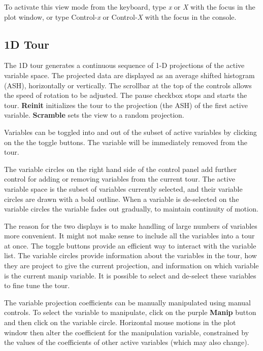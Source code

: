 \documentclass[11pt]{article}
\begin{document}
To activate this view mode from the keyboard, type {\em x} or {\em X}
with the focus in the plot window, or type Control-{\em x} or
Control-{\em X} with the focus in the console.

\subsection{1D Tour}
\label{slbl:1DTour}

The 1D tour generates a continuous sequence of 1-D projections of the
active variable space. The projected data are displayed as an average
shifted histogram (ASH), horizontally or vertically. The scrollbar at the
top of the controls allows the speed of rotation to be adjusted. The
pause checkbox stops and starts the tour. {\bf Reinit} initializes the tour
to the projection (the ASH) of the first active variable.  {\bf Scramble} sets
the view to a random projection.

Variables can be toggled into and out of the subset of active
variables by clicking on the the toggle buttons. The variable will be
immediately removed from the tour. 

The variable circles on the right hand side of the control panel add
further control for adding or removing variables from the current
tour. The active variable space is the subset of variables currently
selected, and their variable circles are drawn with a bold
outline. When a variable is de-selected on the variable circles the
variable fades out gradually, to maintain continuity of motion.

The reason for the two displays is to make handling of large numbers
of variables more convenient. It might not make sense to include all
the variables into a tour at once. The toggle buttons provide an
efficient way to interact with the variable list. The variable circles
provide information about the variables in the tour, how they are
project to give the current projection, and information on which
variable is the current manip variable. It is possible to select and
de-select these variables to fine tune the tour. 

The variable projection coefficients can be manually manipulated
using manual controls. To select the variable to manipulate, click on
the purple {\bf Manip} button and then click on the variable circle.
Horizontal mouse motions in the plot window then alter the coefficient for
the manipulation variable, constrained by the values of the coefficients
of other active variables (which may also change).
\end{document}
